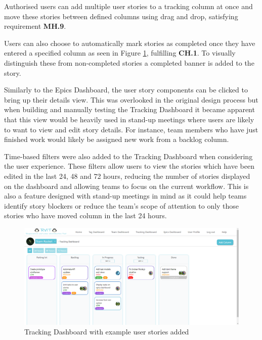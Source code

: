 \documentclass[l4proj.tex]{subfiles}
\begin{document}
Authorised users can add multiple user stories to a tracking column at once and move these stories between defined columns using drag and drop, satisfying requirement \textbf{MH.9}.

Users can also choose to automatically mark stories as completed once they have entered a specified column as seen in Figure \ref{fig:tracking dashboard}, fulfilling \textbf{CH.1}. To visually distinguish these from non-completed stories a completed banner is added to the story.

Similarly to the Epics Dashboard, the user story components can be clicked to bring up their details view. This was overlooked in the original design process but when building and manually testing the Tracking Dashboard it became apparent that this view would be heavily used in stand-up meetings where users are likely to want to view and edit story details. For instance, team members who have just finished work would likely be assigned new work from a backlog column. 

Time-based filters were also added to the Tracking Dashboard when considering the user experience. These filters allow users to view the stories which have been edited in the last 24, 48 and 72 hours, reducing the number of stories displayed on the dashboard and allowing teams to focus on the current workflow. This is also a feature designed with stand-up meetings in mind as it could help teams identify story blockers or reduce the team's scope of attention to only those stories who have moved column in the last 24 hours.

\begin{figure}[h!]
\begin{center}
\includegraphics[scale=0.35]{dissertation/images/TrackingDashboard.png}
\caption{Tracking Dashboard with example user stories added}
\label{fig:tracking dashboard} 
\end{center}
\end{figure}
\end{document}
